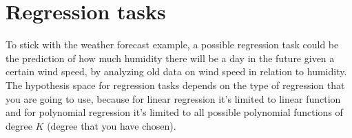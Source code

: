 \section{Regression tasks}

To stick with the weather forecast example, a possible regression task could be the prediction of how much humidity there will be a day in the future given a certain wind speed, by analyzing old data on wind speed in relation to humidity. \\

The hypothesis space for regression tasks depends on the type of regression that you are going to use, because for linear regression it’s limited to linear function and for polynomial regression it’s limited to all possible polynomial functions of degree $K$ (degree that you have chosen).
